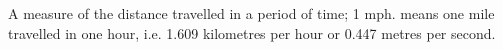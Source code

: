A measure of the distance travelled in a period of time;
1 mph. means one mile travelled in one hour, i.e. 
1.609 kilometres per hour or 0.447 metres per second.
